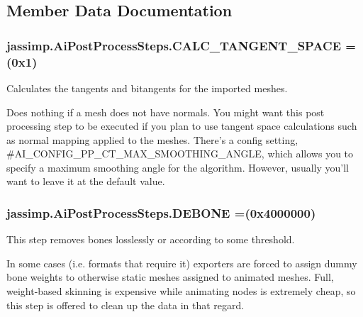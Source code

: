 \subsection{Member Data Documentation}
\hypertarget{enumjassimp_1_1_ai_post_process_steps_a7b06593c65997d422101152bd1c87557}{
\subsubsection[{C\+A\+L\+C\+\_\+\+T\+A\+N\+G\+E\+N\+T\+\_\+\+S\+P\+A\+C\+E}]{\setlength{\rightskip}{0pt plus 5cm}jassimp.\+Ai\+Post\+Process\+Steps.\+C\+A\+L\+C\+\_\+\+T\+A\+N\+G\+E\+N\+T\+\_\+\+S\+P\+A\+C\+E =(0x1)}}\label{enumjassimp_1_1_ai_post_process_steps_a7b06593c65997d422101152bd1c87557}
Calculates the tangents and bitangents for the imported meshes. 

Does nothing if a mesh does not have normals. You might want this post processing step to be executed if you plan to use tangent space calculations such as normal mapping applied to the meshes. There's a config setting, {\ttfamily \#\+A\+I\+\_\+\+C\+O\+N\+F\+I\+G\+\_\+\+P\+P\+\_\+\+C\+T\+\_\+\+M\+A\+X\+\_\+\+S\+M\+O\+O\+T\+H\+I\+N\+G\+\_\+\+A\+N\+G\+L\+E}, which allows you to specify a maximum smoothing angle for the algorithm. However, usually you'll want to leave it at the default value. \hypertarget{enumjassimp_1_1_ai_post_process_steps_a053968901723f8a9af9100a2ff4079c5}{
\subsubsection[{D\+E\+B\+O\+N\+E}]{\setlength{\rightskip}{0pt plus 5cm}jassimp.\+Ai\+Post\+Process\+Steps.\+D\+E\+B\+O\+N\+E =(0x4000000)}}\label{enumjassimp_1_1_ai_post_process_steps_a053968901723f8a9af9100a2ff4079c5}
This step removes bones losslessly or according to some threshold.

In some cases (i.\+e. formats that require it) exporters are forced to assign dummy bone weights to otherwise static meshes assigned to animated meshes. Full, weight-\/based skinning is expensive while animating nodes is extremely cheap, so this step is offered to clean up the data in that regard.

